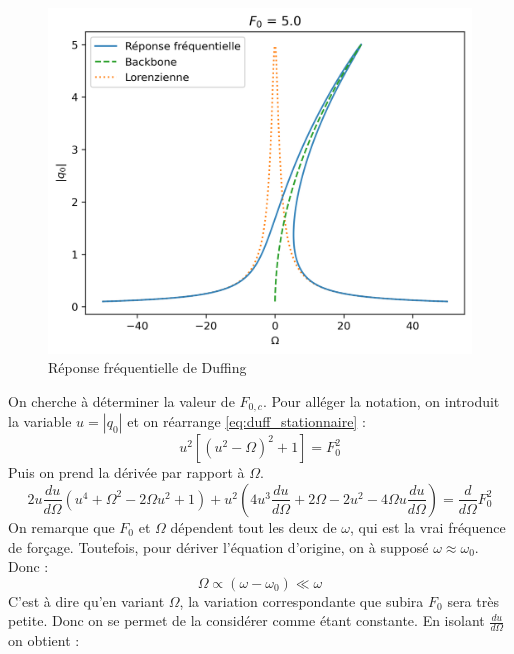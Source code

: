 \begin{figure}
\begin{subcaptionblock}{.31\linewidth}
    \end{subcaptionblock}
    \begin{subcaptionblock}{.31\linewidth}
      \includegraphics[width=\linewidth]{images/duffing/F0=5.0.png}
    \end{subcaptionblock}
    \caption{Réponse fréquentielle de Duffing}
\end{figure}
On cherche à déterminer la valeur de $F_{0, c}$. Pour alléger la notation, 
on introduit la variable $u = |q_0|$ et on réarrange \eqref{eq:duff_stationnaire} :
%
\begin{equation}
    u^2[(u^2 - \Omega)^2 + 1] = F_0^2
    \label{eq:duffing_stationnaire_u}
\end{equation}
%
Puis on prend la dérivée par rapport à $\Omega$.
%
\begin{equation}
    2u\frac{du}{d\Omega}(u^4 + \Omega^2 - 2\Omega u^2 + 1) + u^2(4u^3\frac{du}{d\Omega} + 2\Omega - 2u^2 - 4\Omega u\frac{du}{d\Omega}) = \frac{d}{d\Omega}F_0^2
\end{equation}
%
On remarque que $F_0$ et $\Omega$ dépendent tout les deux de $\omega$, qui est la vrai fréquence de forçage. Toutefois, pour dériver l'équation d'origine, on à supposé $\omega \approx \omega_0$. Donc : 
%
\begin{equation*}
    \Omega \propto (\omega - \omega_0) \ll \omega
\end{equation*}
%
C'est à dire qu'en variant $\Omega$, la variation correspondante que subira $F_0$ sera très petite. Donc on se permet de la considérer comme étant constante. En isolant $\frac{du}{d\Omega}$ on obtient :
